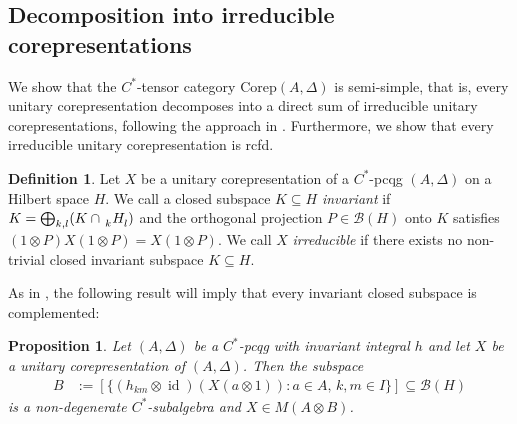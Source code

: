 \documentclass[11pt]{article}
\newcommand{\Corep}{\mathrm{Corep}}
\DeclareMathOperator{\id}{id}
\newcommand{\Gr}[5]{\,\tensor*[^{#2}_{#4}]{#1}{^{#3}_{#5}}}%
\newcommand{\Grd}[3]{\Gr{#1}{}{}{#2}{#3}}
\newtheorem{Prop}[Theorem]{Proposition}
\theoremstyle{definition}
\newtheorem{Def}[Theorem]{Definition}
\numberwithin{equation}{section}
\begin{document}
\subsection{Decomposition into irreducible corepresentations}
We show that the $C^{*}$-tensor category $\Corep(A,\Delta)$ is semi-simple, that is, every unitary
corepresentation decomposes into a direct sum of irreducible unitary corepresentations, following
the approach in \cite{MVD1}. Furthermore, we show that every irreducible unitary corepresentation is rcfd.

\begin{Def}
Let $X$ be a unitary corepresentation of a $C^{*}$-pcqg $(A,\Delta)$ on a
  Hilbert space $H$. We call a closed subspace $K\subseteq H$
  \emph{invariant} if $K=\bigoplus_{k,l} (K \cap \Grd{H}{k}{l})$ %
  and
  the orthogonal projection $P\in \mathcal{B}(H)$ onto $K$ satisfies
  $(1\otimes P)X(1\otimes P)=X(1\otimes P)$.  We call $X$
  \emph{irreducible} if there exists no non-trivial closed invariant
  subspace $K\subseteq H$.
\end{Def}
As in \cite{MVD1}, the  following result will imply that every invariant closed subspace is complemented:
 \begin{Prop}\label{prop:corep-complemented}
   Let $(A,\Delta)$ be a $C^{*}$-pcqg with invariant integral $h$ and
   let $X$ be a unitary corepresentation of $(A,\Delta)$. Then the
   subspace
   \begin{align*}
     B &:= [ \{(h_{km} \otimes
     \id)(X(a\otimes 1)) : a \in A,\, k,m\in I\}] \subseteq \mathcal{B}(H)
   \end{align*}
   is a non-degenerate $C^{*}$-subalgebra and $X\in M(A\otimes B)$.
 \end{Prop}
\end{document}
